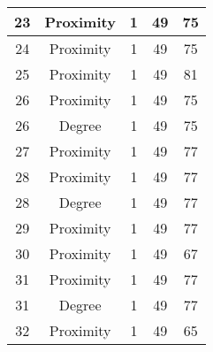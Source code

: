 \documentclass[results.tex]{subfiles}
\begin{document}
\begin{center}
\begin{tabular}{| c || c | c | c | c |}
            \hline
            23                      & Proximity                    & 1                      & 49                      & 75                   \\
            \hline
            24                      & Proximity                    & 1                      & 49                      & 75                   \\
            \hline
            25                      & Proximity                    & 1                      & 49                      & 81                   \\
            \hline
            26                      & Proximity                    & 1                      & 49                      & 75                   \\
            \hline
            26                      & Degree                       & 1                      & 49                      & 75                   \\
            \hline
            27                      & Proximity                    & 1                      & 49                      & 77                   \\
            \hline
            28                      & Proximity                    & 1                      & 49                      & 77                   \\
            \hline
            28                      & Degree                       & 1                      & 49                      & 77                   \\
            \hline
            29                      & Proximity                    & 1                      & 49                      & 77                   \\
            \hline
            30                      & Proximity                    & 1                      & 49                      & 67                   \\
            \hline
            31                      & Proximity                    & 1                      & 49                      & 77                   \\
            \hline
            31                      & Degree                       & 1                      & 49                      & 77                   \\
            \hline
            32                      & Proximity                    & 1                      & 49                      & 65                   \\

\end{tabular}
\end{center}
\end{document}
